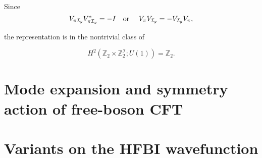 

%

Since
$$
V_{\mathcal{\pi} \mathcal{I}_y} V_{\mathcal{\pi} \mathcal{I}_y}^* = -I \text{\quad or \quad } V_{\mathcal{\pi}} V_{\mathcal{I}_y} = - V_{\mathcal{I}_y} V_{\mathcal{\pi}},
$$

the representation is in the nontrivial class of

$$
H^2(\mathbb{Z}_2 \times \mathbb{Z}_2^{\mathcal{I}}; U(1)) = \mathbb{Z}_2.
$$


\section{Mode expansion and symmetry action of free-boson CFT}
\label{Appendix:CFT}

\section{Variants on the HFBI wavefunction}
\label{Appendix:Variants}